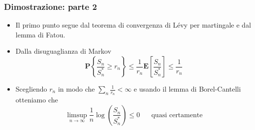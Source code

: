 \documentclass{beamer}
\theoremstyle{plain}
\theoremstyle{definition}
\theoremstyle{remark}
\newcommand{\Pro}{\mathbf{P}}
\newcommand{\E}{\mathbf{E}}
\begin{document}
\begin{frame}
	\frametitle{Dimostrazione: parte 2}
	\begin{itemize}
		\item Il primo punto segue dal teorema di convergenza di Lévy per martingale e dal lemma di Fatou.
		\item Dalla disuguaglianza di Markov
		\begin{equation*}
		\Pro\left\{\frac{S_n}{S_n^*}\geq r_n\right\} \leq \frac{1}{r_n}\E\left[\frac{S_n}{S_n^*}\right]\leq \frac{1}{r_n}
		\end{equation*}
		\item Scegliendo $r_n$ in modo che $\sum_n \frac{1}{r_n}<\infty$ e usando il lemma di Borel-Cantelli otteniamo che
		\begin{equation*}
		\limsup\limits_{n\to\infty}\frac{1}{n}\log\left(\frac{S_n}{S_n^*}\right)\leq 0 \;\;\;\;\;\; \text{quasi certamente}
		\end{equation*}
	\end{itemize}
\end{frame}
\end{document}
